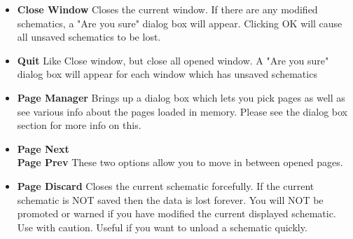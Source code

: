 \documentclass{article}
\begin{document}
\begin{itemize}
\item {\bf Close Window} Closes the current window.  If there are any
  modified schematics, a "Are you sure" dialog box will appear.
  Clicking OK will cause all unsaved schematics to be lost.
  
\item {\bf Quit} Like Close window, but close all opened window.  A
  "Are you sure" dialog box will appear for each window which has
  unsaved schematics
  
\item {\bf Page Manager} Brings up a dialog box which lets you pick
  pages as well as see various info about the pages loaded in memory.
  Please see the dialog box section for more info on this.
  

\item {\bf Page Next}\\
  {\bf Page Prev} These two options allow you to move in between
  opened pages.
  
\item {\bf Page Discard} Closes the current schematic forcefully.  If
  the current schematic is NOT saved then the data is lost forever.
  You will NOT be promoted or warned if you have modified the current
  displayed schematic.  Use with caution.  Useful if you want to
  unload a schematic quickly.

\end{itemize}
\end{document}
